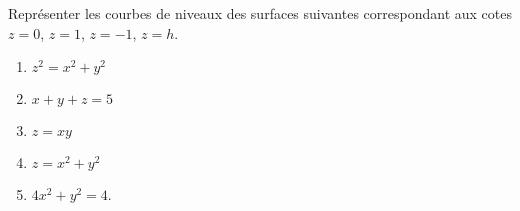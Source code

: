 \begin{exercice}\label{exoFoncDeuxVar0001}

Représenter les courbes de niveaux des surfaces suivantes correspondant aux cotes $z=0$, $z=1$, $z=-1$, $z=h$.
\begin{multicols}{2}
	\begin{enumerate}

\item
$z^2=x^2+y^2$
\item
$x+y+z=5$
\item
$z=xy$
\item
$z=x^2+y^2$
\item
$4x^2+y^2=4$.

\end{enumerate}

\end{multicols}


\end{exercice}
